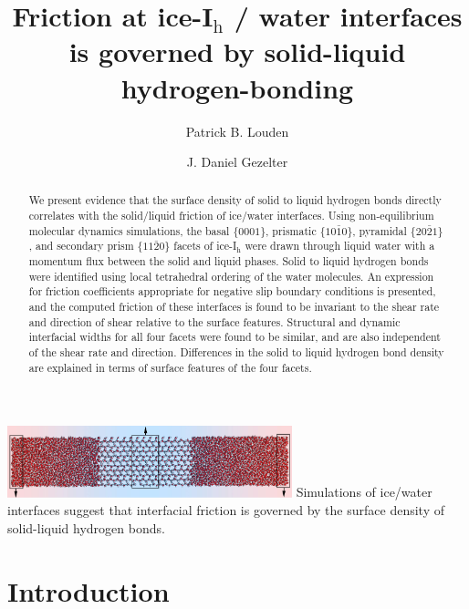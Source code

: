 \documentclass[journal = jpccck, manuscript = article]{achemso}
\title[Friction at ice-I$_\mathrm{h}$ / water interfaces]{Friction at ice-I$_\mathrm{h}$ / water interfaces is governed
  by solid-liquid hydrogen-bonding}
\author{Patrick B. Louden}
\author{J. Daniel Gezelter} \email{gezelter@nd.edu}
\affiliation{Department of Chemistry and Biochemistry, University of
  Notre Dame, Notre Dame, IN 46556}
\begin{document}
\begin{tocentry}
\center\includegraphics[width=3.25in]{ShearingTOC.pdf} 
Simulations of ice/water interfaces suggest that interfacial friction is
governed by the surface density of solid-liquid hydrogen bonds.
\end{tocentry}

\begin{abstract}
  We present evidence that the surface density of solid to liquid
  hydrogen bonds directly correlates with the solid/liquid friction of
  ice/water interfaces. Using non-equilibrium molecular dynamics
  simulations, the basal $\{0001\}$, prismatic $\{10\bar{1}0\}$,
  pyramidal $\{20\bar{2}1\}$, and secondary prism $\{11\bar{2}0\}$
  facets of ice-I$_\mathrm{h}$ were drawn through liquid water with a
  momentum flux between the solid and liquid phases. Solid to liquid
  hydrogen bonds were identified using local tetrahedral ordering of
  the water molecules. An expression for friction coefficients
  appropriate for negative slip boundary conditions is presented, and
  the computed friction of these interfaces is found to be invariant
  to the shear rate and direction of shear relative to the surface
  features. Structural and dynamic interfacial widths for all four
  facets were found to be similar, and are also independent of the
  shear rate and direction. Differences in the solid to liquid
  hydrogen bond density are explained in terms of surface features of
  the four facets.
\end{abstract}


\section{Introduction}
\end{document}
